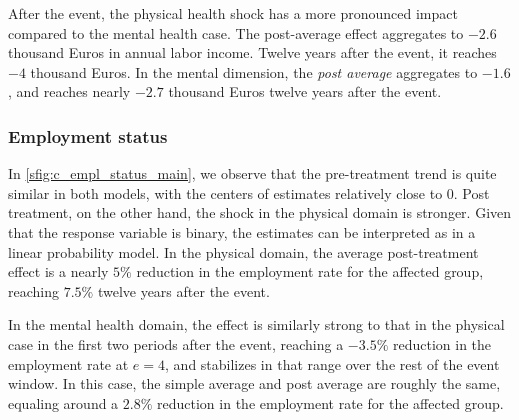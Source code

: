 After the event, the physical health shock has a more pronounced impact compared to the mental health case. The
post-average effect aggregates to $-2.6$ thousand Euros in annual labor income. Twelve years after the event,
it reaches $-4$ thousand Euros. In the mental dimension, the \textit{post average} aggregates to $-1.6$, and
reaches nearly $-2.7$ thousand Euros twelve years after the event.


\subsubsection{Employment status} In \cref{sfig:c_empl_status_main}, we observe that the pre-treatment trend is
quite similar in both models, with the centers of estimates relatively close to 0. Post treatment, on the other
hand, the shock in the physical domain is stronger. Given that the response variable is binary, the estimates
can be interpreted as in a linear probability model. In the physical domain, the average post-treatment effect
is a nearly $5\%$ reduction in the employment rate for the affected group, reaching $7.5\%$ twelve years after the
event.

In the mental health domain, the effect is similarly strong to that in the physical case in the first two periods
after the event, reaching a $-3.5\%$ reduction in the employment rate at $e=4$, and stabilizes in that range
over the rest of the event window. In this case, the simple average and post average are roughly the same,
equaling around a $2.8\%$ reduction in the employment rate for the affected group.

